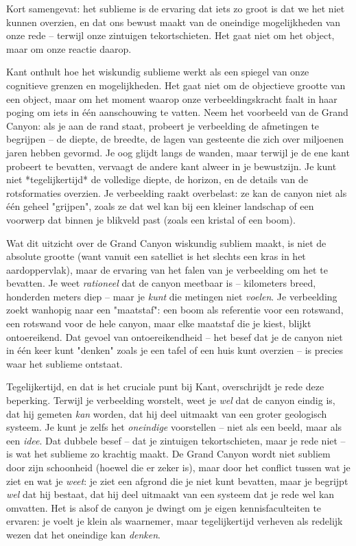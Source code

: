 \begin{mdframed}[leftmargin=0pt,rightmargin=0pt,backgroundcolor=blue!6,linecolor=white,innertopmargin=6pt,innerbottommargin=6pt]
Kort samengevat: het sublieme is de ervaring dat iets zo groot is dat we het niet kunnen overzien, en dat ons bewust maakt van de oneindige mogelijkheden van onze rede – terwijl onze zintuigen tekortschieten. Het gaat niet om het object, maar om onze reactie daarop.

\bigskip
Kant onthult hoe het wiskundig sublieme werkt als een spiegel van onze cognitieve grenzen en mogelijkheden. Het gaat niet om de objectieve grootte van een object, maar om het moment waarop onze verbeeldingskracht faalt in haar poging om iets in één aanschouwing te vatten. Neem het voorbeeld van de Grand Canyon: als je aan de rand staat, probeert je verbeelding de afmetingen te begrijpen – de diepte, de breedte, de lagen van gesteente die zich over miljoenen jaren hebben gevormd. Je oog glijdt langs de wanden, maar terwijl je de ene kant probeert te bevatten, vervaagt de andere kant alweer in je bewustzijn. Je kunt niet *tegelijkertijd* de volledige diepte, de horizon, en de details van de rotsformaties overzien. Je verbeelding raakt overbelast: ze kan de canyon niet als één geheel "grijpen", zoals ze dat wel kan bij een kleiner landschap of een voorwerp dat binnen je blikveld past (zoals een kristal of een boom).

Wat dit uitzicht over de Grand Canyon wiskundig subliem maakt, is niet de absolute grootte (want vanuit een satelliet is het slechts een kras in het aardoppervlak), maar de ervaring van het falen van je verbeelding om het te bevatten. Je weet \textit{rationeel} dat de canyon meetbaar is – kilometers breed, honderden meters diep – maar je \textit{kunt} die metingen niet \textit{voelen}. Je verbeelding zoekt wanhopig naar een "maatstaf": een boom als referentie voor een rotswand, een rotswand voor de hele canyon, maar elke maatstaf die je kiest, blijkt ontoereikend. Dat gevoel van ontoereikendheid – het besef dat je de canyon niet in één keer kunt "denken" zoals je een tafel of een huis kunt overzien – is precies waar het sublieme ontstaat.

Tegelijkertijd, en dat is het cruciale punt bij Kant, overschrijdt je rede deze beperking. Terwijl je verbeelding worstelt, weet je \textit{wel} dat de canyon eindig is, dat hij gemeten \textit{kan} worden, dat hij deel uitmaakt van een groter geologisch systeem. Je kunt je zelfs het \textit{oneindige} voorstellen – niet als een beeld, maar als een \textit{idee}. Dat dubbele besef – dat je zintuigen tekortschieten, maar je rede niet – is wat het sublieme zo krachtig maakt. De Grand Canyon wordt niet subliem door zijn schoonheid (hoewel die er zeker is), maar door het conflict tussen wat je ziet en wat je \textit{weet}: je ziet een afgrond die je niet kunt bevatten, maar je begrijpt \textit{wel} dat hij bestaat, dat hij deel uitmaakt van een systeem dat je rede wel kan omvatten. Het is alsof de canyon je dwingt om je eigen kennisfaculteiten te ervaren: je voelt je klein als waarnemer, maar tegelijkertijd verheven als redelijk wezen dat het oneindige kan \textit{denken}.


\end{mdframed}
